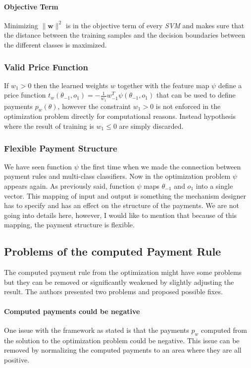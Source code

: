 \documentclass[]{article}
\begin{document}
\paragraph{Objective Term} Minimizing $\lVert \mathbf{w} \rVert^{2}$ is in the objective term of every \emph{SVM} and makes sure that the distance between the training samples and the decision boundaries between the different classes is maximized.

\subsubsection{Valid Price Function}
\noindent If $w_{1} > 0$ then the learned weights $w$ together with the feature map $\psi$ define a price function 	$t_{w}(\theta_{-1}, o_{1}) = - \frac{1}{w_{1}} w_{-1}^T \psi(\theta_{-1},o_{1})$ that can be used to define payments $p_{w}(\theta)$, however the constraint $w_{1} > 0$ is not enforced in the optimization problem directly for computational reasons. Instead hypothesis where the result of training is $w_{1} \leq 0$ are simply discarded.

\subsubsection{Flexible Payment Structure}
We have seen function $\psi$ the first time when we made the connection between payment rules and multi-class classifiers. Now in the optimization problem $\psi$ appears again. As previously said, function $\psi$ maps $\theta_{-1}$ and $o_{1}$ into a single vector.
This mapping of input and output is something the mechanism designer has to specify and has an effect on the structure of the payments.
We are not going into details here, however, I would like to mention that because of this mapping, the payment structure is flexible.

\subsection{Problems of the computed Payment Rule}
The computed payment rule from the optimization might have some problems but they can be removed or significantly weakened by slightly adjusting the result. The authors presented two problems and proposed possible fixes.

\paragraph{Computed payments could be negative}  One issue with the framework as stated is that the payments $p_{w}$ computed from the solution to the optimization problem could be negative. This issue can be removed by normalizing the computed payments to an area where they are all positive.
\end{document}
